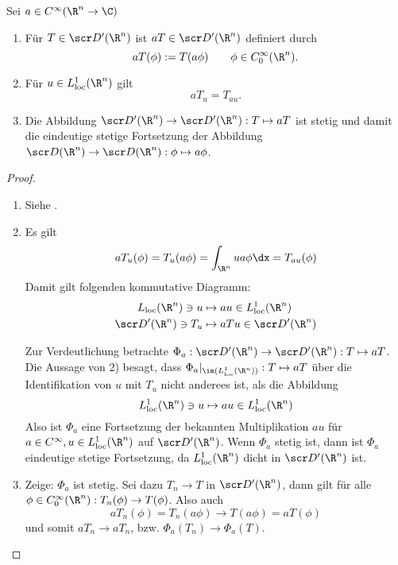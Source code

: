 \begin{st} \label{5.18}
	Sei $a \in C^\infty (\R^n \to \C)$
	\begin{enumerate}[1)]
		\item
			Für $T \in \scr D'(\R^n)$ ist $a T \in \scr D'(\R^n)$ definiert durch
			\[
				a T (\phi) := T(a \phi)
				\qquad \phi \in C_0^\infty (\R^n).
			\]
		\item
			Für $u \in L_{\text{loc}}^1 (\R^n)$ gilt
			\[
				a T_u = T_{au}.
			\]
		\item
			Die Abbildung $\scr D'(\R^n) \to \scr D'(\R^n) : T \mapsto a T$ ist stetig und damit die eindeutige stetige Fortsetzung der Abbildung $\scr D(\R^n) \to \scr D(\R^n) : \phi \mapsto a \phi$.
	\end{enumerate}
	\begin{proof}
		\begin{enumerate}[1)]
			\item
				Siehe .
			\item
				Es gilt
				\begin{align*}
					a T_u (\phi)
					= T_u (a \phi)
					= \int_{\R^n} u a \phi \dx
					= T_{au} (\phi)
				\end{align*}
				Damit gilt folgenden kommutative Diagramm:
				\begin{align*}
					L_{\text{loc}}(\R^n) \ni u &\mapsto a u \in L_{\text{loc}}^1(\R^n) \\
					\scr D'(\R^n) \ni T_u &\mapsto a T u \in \scr D'(\R^n)
				\end{align*}

				Zur Verdeutlichung betrachte $\Phi_a : \scr D'(\R^n) \to \scr D'(\R^n) : T \mapsto a T$.
				Die Aussage von 2) besagt, dass $\Phi_a |_{\im(L_\text{loc}^1(\R^n))} : T \mapsto a T$ über die Identifikation von $u$ mit $T_u$ nicht anderees ist, als die Abbildung
				\[
					L_{\text{loc}}^1 (\R^n) \ni u \mapsto a u \in L_{\text{loc}}^1(\R^n)
				\]
				Also ist $\Phi_a$ eine Fortsetzung der bekannten Multiplikation $a u$ für $a \in C^\infty, u \in L_{\text{loc}}^1(\R^n)$ auf $\scr D'(\R^n)$.
				Wenn $\Phi_a$ stetig ist, dann ist $\Phi_a$ eindeutige stetige Fortsetzung, da $L_{\text{loc}}^1(\R^n)$ dicht in $\scr D'(\R^n)$ ist.
			\item
				Zeige: $\Phi_a$ ist stetig.
				Sei dazu $T_n \to T$ in $\scr D'(\R^n)$, dann gilt für alle $\phi \in C_0^\infty(\R^n) : T_n(\phi) \to T(\phi)$.
				Also auch 
				\[
					a T_n(\phi) = T_n(a\phi) \to T(a\phi) = a T(\phi)
				\]
				und somit $a T_n \to a T_n$, bzw. $\Phi_a (T_n) \to \Phi_a (T)$.
		\end{enumerate}
	\end{proof}
\end{st}

